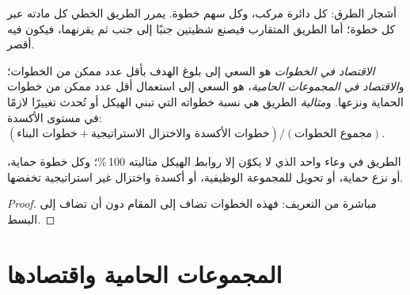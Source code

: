 \begin{omfigure}

{\small أشجار الطرق: كل دائرة مركب، وكل سهم خطوة. يمرر الطريق الخطي
كل مادته عبر كل خطوة؛ أما الطريق المتقارب فيصنع شظيتين
جنبًا إلى جنب ثم يقرنهما، فيكون  فيه أقصر.}
\end{omfigure}

\begin{definition}\label{def:b3:total-synthesis:economy}
\emph{الاقتصاد في الخطوات} هو السعي إلى بلوغ الهدف بأقل
عدد ممكن من الخطوات؛ و\emph{الاقتصاد في المجموعات الحامية}،
هو السعي إلى استعمال أقل عدد ممكن من خطوات الحماية ونزعها. 
و\emph{مثالية} الطريق هي نسبة خطواته التي
تبني الهيكل أو تُحدث تغييرًا لازمًا في مستوى الأكسدة:
$(\text{خطوات البناء} + \text{خطوات الأكسدة والاختزال الاستراتيجية})/(\text{مجموع الخطوات})$.
\end{definition}

\begin{proposition}\label{prop:b3:total-synthesis:ideality}
الطريق في وعاء واحد الذي لا يكوّن إلا روابط الهيكل مثاليته 100\,\%؛ وكل خطوة حماية،
أو نزع حماية، أو تحويل للمجموعة الوظيفية، أو أكسدة واختزال غير استراتيجية
تخفضها.
\end{proposition}

\begin{proof}
مباشرة من التعريف: فهذه الخطوات تضاف إلى المقام دون أن تضاف
إلى البسط.
\end{proof}

\section{المجموعات الحامية واقتصادها}

